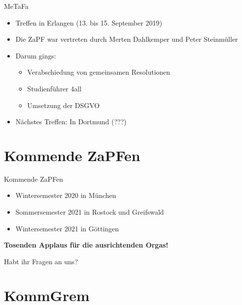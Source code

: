 \documentclass[compress, aspectratio=169]{beamer}
\begin{document}
 \begin{frame}{MeTaFa}
  \begin{itemize}
    \item Treffen in Erlangen (13. bis 15. September 2019)
    \item Die ZaPF war vertreten durch Merten Dahlkemper und Peter Steinmüller
    \item Darum gings:
    \begin{itemize}
        \item Verabschiedung von gemeinsamen Resolutionen
        \item Studienführer 4all
        \item Umsetzung der DSGVO
    \end{itemize}
    \item Nächstes Treffen: In Dortmund (???)
   \end{itemize}
 \end{frame}

\section{Kommende ZaPFen}
\begin{frame}{Kommende ZaPFen}
  \begin{itemize}
    \item Wintersemester 2020 in München
    \item Sommersemester 2021 in Rostock und Greifswald
    \item Wintersemester 2021 in Göttingen
    \end{itemize}
    \vspace{1cm}
    \begin{center}
      \huge \textbf{Tosenden Applaus für die ausrichtenden Orgas!}
    \end{center}
\end{frame}

\begin{frame}[plain]
  \begin{center}
    \Huge Habt ihr Fragen an uns?
    \end{center}
\end{frame}

\section{KommGrem}
\end{document}
